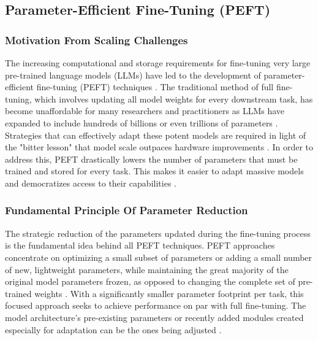 \documentclass{DESSThesis}
\begin{document}
\subsection{Parameter-Efficient Fine-Tuning (PEFT)}

\subsubsection{Motivation From Scaling Challenges}
The increasing computational and storage requirements for fine-tuning very large pre-trained language models (LLMs) have led to the development of parameter-efficient fine-tuning (PEFT) techniques \cite{houlsby_parameter-efficient_2019,lialin_scaling_2023,hu_lora_2021}. The traditional method of full fine-tuning, which involves updating all model weights for every downstream task, has become unaffordable for many researchers and practitioners as LLMs have expanded to include hundreds of billions or even trillions of parameters \cite{lialin_scaling_2023,mao_survey_2025}. Strategies that can effectively adapt these potent models are required in light of the "bitter lesson" that model scale outpaces hardware improvements \cite{lialin_scaling_2023}. In order to address this, PEFT drastically lowers the number of parameters that must be trained and stored for every task. This makes it easier to adapt massive models and democratizes access to their capabilities \cite{ruder_modular_2022,lialin_scaling_2023}.

\subsubsection{Fundamental Principle Of Parameter Reduction}
The strategic reduction of the parameters updated during the fine-tuning process is the fundamental idea behind all PEFT techniques. PEFT approaches concentrate on optimizing a small subset of parameters or adding a small number of new, lightweight parameters, while maintaining the great majority of the original model parameters frozen, as opposed to changing the complete set of pre-trained weights \cite{lialin_scaling_2023,ruder_modular_2022}. With a significantly smaller parameter footprint per task, this focused approach seeks to achieve performance on par with full fine-tuning. The model architecture's pre-existing parameters or recently added modules created especially for adaptation can be the ones being adjusted \cite{lialin_scaling_2023}.
\end{document}
